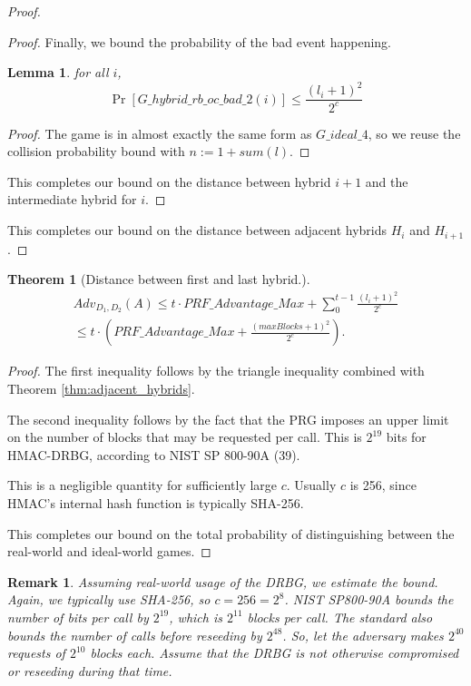 \documentclass[12pt,lot, lof]{puthesis}
\newcommand{\f}{\frac}
\newtheorem{thm}{Theorem}
\newtheorem{lem}{Lemma}[thm]
\newtheorem{rem}{Remark}[thm]
\begin{document}
{\begin{proof}
\begin{proof}
Finally, we bound the probability of the bad event happening.

\begin{lem} for all $i$,
$$\Pr[G\_hybrid\_rb\_oc\_bad\_2(i)] \leq \f{(l_i+1)^2}{2^c}$$ \end{lem}
\begin{proof} 
The game is in almost exactly the same form as $G\_ideal\_4$, so we reuse the collision probability bound with $n := 1 + sum(l)$.
\end{proof}

This completes our bound on the distance between hybrid $i+1$ and the intermediate hybrid for $i$.
\end{proof}

This completes our bound on the distance between adjacent hybrids $H_i$ and $H_{i+1}$.

\end{proof}

\begin{thm}[Distance between first and last hybrid.] \label{thm:hybrids}
\begin{gather*}
Adv_{D_1, D_2}(A) \leq t \cdot PRF\_Advantage\_Max + \sum_{0}^{t-1} \f{(l_i+1)^2}{2^c} \\ 
\leq t \cdot (PRF\_Advantage\_Max + \f{(maxBlocks + 1)^2}{2^c}).
\end{gather*}
\end{thm}
\begin{proof}
The first inequality follows by the triangle inequality combined with Theorem \ref{thm:adjacent_hybrids}. 

The second inequality follows by the fact that the PRG imposes an upper limit on the number of blocks that may be requested per call. This is $2^{19}$ bits for HMAC-DRBG, according to NIST SP 800-90A (39).

This is a negligible quantity for sufficiently large $c$. Usually $c$ is 256, since HMAC's internal hash function is typically SHA-256.

This completes our bound on the total probability of distinguishing between the real-world and ideal-world games.
\end{proof}

\begin{rem} Assuming real-world usage of the DRBG, we estimate the bound. Again, we typically use SHA-256, so $c = 256 = 2^8$. NIST SP800-90A bounds the number of bits per call by $2^{19}$, which is $2^{11}$ blocks per call. The standard also bounds the number of calls before reseeding by $2^{48}$. So, let the adversary makes $2^{40}$ requests of $2^{10}$ blocks each. Assume that the DRBG is not otherwise compromised or reseeding during that time. 


\end{rem}}
\end{document}
